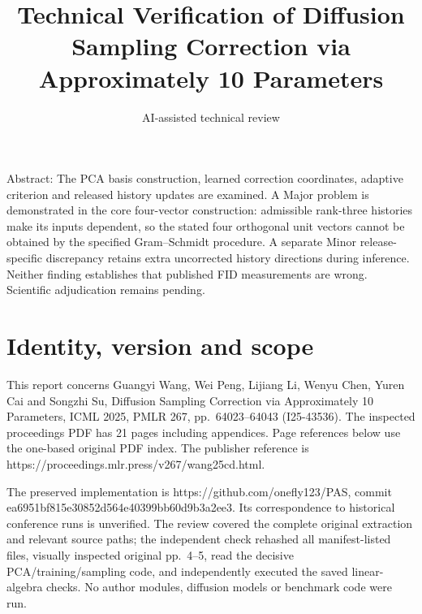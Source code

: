 \documentclass[10pt]{article}
\title{Technical Verification of Diffusion Sampling Correction via Approximately 10 Parameters}
\author{AI-assisted technical review}
\date{}
\begin{document}
\maketitle
Abstract: The PCA basis construction, learned correction coordinates, adaptive criterion and released history updates are examined. A Major problem is demonstrated in the core four-vector construction: admissible rank-three histories make its inputs dependent, so the stated four orthogonal unit vectors cannot be obtained by the specified Gram–Schmidt procedure. A separate Minor release-specific discrepancy retains extra uncorrected history directions during inference. Neither finding establishes that published FID measurements are wrong. Scientific adjudication remains pending.\par
\section*{Identity, version and scope}
This report concerns Guangyi Wang, Wei Peng, Lijiang Li, Wenyu Chen, Yuren Cai and Songzhi Su, Diffusion Sampling Correction via Approximately 10 Parameters, ICML 2025, PMLR 267, pp. 64023–64043 (I25-43536). The inspected proceedings PDF has 21 pages including appendices. Page references below use the one-based original PDF index. The publisher reference is https://proceedings.mlr.press/v267/wang25cd.html.\par
The preserved implementation is https://github.com/onefly123/PAS, commit ea6951bf815e30852d564e40399bb60d9b3a2ee3. Its correspondence to historical conference runs is unverified. The review covered the complete original extraction and relevant source paths; the independent check rehashed all manifest-listed files, visually inspected original pp. 4–5, read the decisive PCA/training/sampling code, and independently executed the saved linear-algebra checks. No author modules, diffusion models or benchmark code were run.\par
\end{document}
